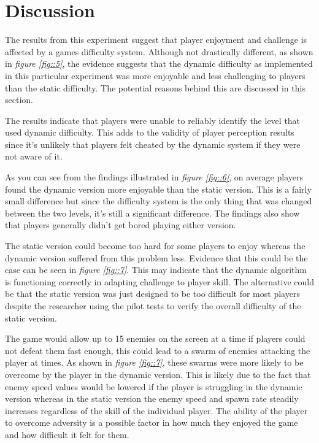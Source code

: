 \documentclass[journal]{IEEEtran}
\begin{document}
\section{Discussion}
The results from this experiment suggest that player enjoyment and challenge is affected by a games difficulty system. Although not drastically different, as shown in \textit{figure \ref{fig::5}}, the evidence suggests that the dynamic difficulty as implemented in this particular experiment was more enjoyable and less challenging to players than the static difficulty. The potential reasons behind this are discussed in this section.

The results indicate that players were unable to reliably identify the level that used dynamic difficulty. This adds to the validity of player perception results since it's unlikely that players felt cheated by the dynamic system if they were not aware of it. 

As you can see from the findings illustrated in \textit{figure \ref{fig::6}}, on average players found the dynamic version more enjoyable than the static version. This is a fairly small difference but since the difficulty system is the only thing that was changed between the two levels, it's still a significant difference. The findings also show that players generally didn't get bored playing either version. 

The static version could become too hard for some players to enjoy whereas the dynamic version suffered from this problem less. Evidence that this could be the case can be seen in \textit{figure \ref{fig::7}}. This may indicate that the dynamic algorithm is functioning correctly in adapting challenge to player skill. The alternative could be that the static version was just designed to be too difficult for most players despite the researcher using the pilot tests to verify the overall difficulty of the static version.

The game would allow up to 15 enemies on the screen at a time if players could not defeat them fast enough, this could lead to a swarm of enemies attacking the player at times. As shown in \textit{figure \ref{fig::7}}, these swarms were more likely to be overcome by the player in the dynamic version. This is likely due to the fact that enemy speed values would be lowered if the player is struggling in the dynamic version whereas in the static version the enemy speed and spawn rate steadily increases regardless of the skill of the individual player. The ability of the player to overcome adversity is a possible factor in how much they enjoyed the game and how difficult it felt for them.
\end{document}
